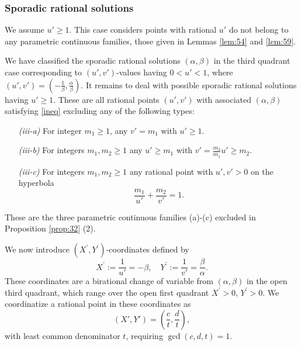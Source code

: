 \documentclass[12pt,letterpaper, reqno]{amsart}
\theoremstyle{definition}
\theoremstyle{remark}
\newcommand{\uu}{{u'}}
\newcommand{\vv}{{v'}}
\begin{document}
%
%
\subsubsection{Sporadic rational solutions}\label{sec:552}

We  assume ${\uu} \ge 1$.
This case  considers points with rational $\uu$ do not belong to any
parametric continuous families, those
 given in Lemmas \ref{lem:54} and \ref{lem:59}.

We have classified the sporadic rational solutions $(\alpha, \beta)$
in the third quadrant case corresponding to $(\uu, \vv)$-values having  $0 < {\uu} <1$,
where $(\uu, \vv) = (-\frac{1}{\beta}, \frac{\alpha}{\beta})$.
It remains to deal with possible sporadic rational solutions 
having  ${\uu} \ge 1$. These are all rational points $(\uu, \vv)$ with associated $(\alpha, \beta)$
satisfying \eqref{ineq} excluding any of the following types: 
\begin{enumerate}
\item[{\it (iii-a)}] For integer $m_1 \ge 1$, any  $\vv= {m_1}$  with  $\uu \ge {1}$.
\item[{\it (iii-b)}] For integers $m_1, m_2 \ge 1$ any  $\uu\geq{m_1}$  with $ \vv =\frac{m_2}{m_1}\uu\geq{m_2}.$
\item[{\it (iii-c)}] For integers $m_1, m_2 \ge 1$ any  rational point with $\uu, \vv >0$ on the hyperbola 
$$
\frac{m_1}{{\uu}} + \frac{m_2}{{\vv}} =1.
$$
\end{enumerate}
These are the three parametric continuous families (a)-(c) excluded
in Proposition \ref{prop:32} (2).

We now introduce  $(X^{'}, Y^{'})$-coordinates defined by 
$$X^{'} := \frac{1}{\uu} = -\beta, \quad  Y^{' }:= \frac1{\vv} = \frac{\beta}{\alpha}.$$
These coordinates are a birational
change of variable from $(\alpha, \beta)$ in the open third
quadrant, which  range over the open first quadrant $X^{'} >0, \, Y^{'} >0$.
We coordinatize a rational point in these coordinates as 
$$(X', Y') = (\frac{c}{t}, \frac{d}{t}),$$
 with least common denominator $t$, requiring
$\gcd(c, d, t)=1$. 
\end{document}
